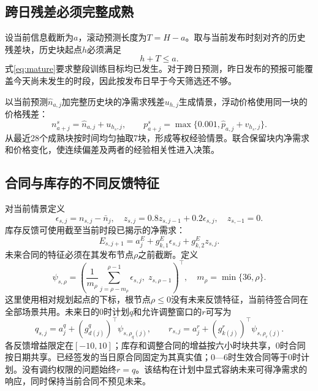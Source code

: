 \documentclass[UTF8,a4paper,zihao=-4,fontset=mac]{ctexart}
\begin{document}
\subsection{跨日残差必须完整成熟}
设当前信息截断为$a$，滚动预测长度为$T=H-a$。取与当前发布时刻对齐的历史残差块，历史块起点$h$必须满足
\begin{equation}
 h+T\le a.\label{eq:mature}
\end{equation}
式\eqref{eq:mature}要求整段训练目标均已发生。对于跨日预测，昨日发布的预报可能覆盖今天尚未发生的时段，因此按发布日早于今天筛选还不够。

以当前预测$\widehat n_{a,j}$加完整历史块的净需求残差$u_{h,j}$生成情景，浮动价格使用同一块的价格残差：
\begin{equation}
 n^s_{a+j}=\widehat n_{a,j}+u_{h_s,j},\qquad
 p^s_{a+j}=\max\{0.001,\widehat p_{a,j}+v_{h_s,j}\}.
\end{equation}
从最近28个成熟块按时间均匀抽取7块，形成等权经验情景。联合保留块内净需求和价格变化，使连续偏差及两者的经验相关性进入决策。

\subsection{合同与库存的不同反馈特征}
对当前情景定义
\begin{equation}
 \epsilon_{s,j}=n_{s,j}-\bar n_j,\quad z_{s,j}=0.8z_{s,j-1}+0.2\epsilon_{s,j},\quad z_{s,-1}=0.
\end{equation}
库存反馈可使用截至当前时段已揭示的净需求：
\begin{equation}
 E_{s,j+1}=a^E_j+g^E_{k,1}\epsilon_{s,j}+g^E_{k,2}z_{s,j}.\label{eq:affineE}
\end{equation}
未来合同的特征必须在其发布节点$\rho$之前截断。定义
\begin{equation}
 \psi_{s,\rho}=\left(\frac1{m_\rho}\sum_{j=\rho-m_\rho}^{\rho-1}\epsilon_{s,j},\;z_{s,\rho-1}\right)^\top,
 \quad m_\rho=\min\{36,\rho\}.
\end{equation}
这里使用相对规划起点的下标，根节点$\rho\le0$没有未来反馈特征，当前待签合同在全部场景共用。未来日的0时计划$q$和允许调整窗口的$r$可写为
\begin{equation}
 q_{s,j}=a^q_j+(g^q_{d(j)})^\top\psi_{s,\rho_q(j)},\qquad
 r_{s,j}=a^r_j+(g^r_{k(j)})^\top\psi_{s,\rho_r(j)}.\label{eq:affineQ}
\end{equation}
各反馈增益限定在$[-10,10]$；库存和调整合同的增益按六小时块共享，0时合同按日期共享。已经签发的当日原合同固定为其真实值；0—6时生效合同等于0时计划。没有调约权限的问题始终$r=q$。该结构在计划中显式容纳未来可得净需求的响应，同时保持当前合同不预见未来。
\end{document}
